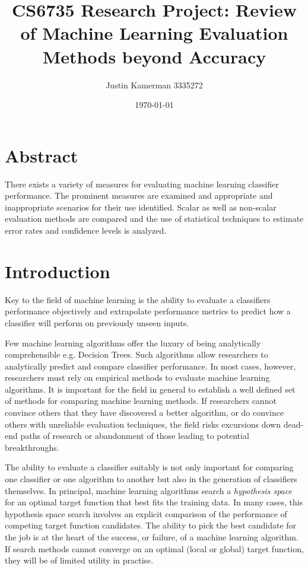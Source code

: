 \documentclass[10pt]{unbthesis}
\title{CS6735 Research Project: Review of Machine Learning Evaluation
  Methods beyond Accuracy}
\author{Justin Kamerman 3335272}
\date{\today}
\begin{document}
\maketitle
\renewcommand*\thesection{\arabic{section}}

\section*{Abstract}
There exists a variety of measures for evaluating machine
learning classifier performance. The prominent measures are examined
and appropriate and inappropriate scenarios for their use
identified. Scalar as well as non-scalar evaluation methods are
compared and the use of statistical techniques to estimate error rates
and confidence levels is analyzed.

\section{Introduction}
Key to the field of machine learning is the ability to evaluate a
classifiers performance objectively and extrapolate performance
metrics to predict how a classifier will perform on previously
unseen inputs. 

Few machine learning algorithms offer the luxury of being analytically
comprehensible e.g. Decision Trees. Such algorithms
allow researchers to analytically predict and compare classifier
performance. In most cases, however, researchers must rely on
empirical methods to evaluate machine learning algorithms. It is
important for the field in general to establish a well defined set of
methods for comparing machine learning methods. If researchers cannot
convince others that they have discovered a better algorithm, or do
convince others with unreliable evaluation techniques, the field risks
excursions down dead-end paths of research or abandonment of those
leading to potential breakthroughs. 

The ability to evaluate a classifier suitably is not
only important for comparing one classifier or one algorithm to
another but also in the generation of classifiers themselves. In
principal, machine learning algorithms search a
\textit{hypothesis space} for an optimal target function that best
fits the training data. In many cases, this hypothesis space search
involves an explicit comparison of the performance of competing target
function candidates. The ability to pick the best candidate for the
job is at the heart of the success, or failure, of a machine learning
algorithm. If search methods cannot converge on an optimal (local or
global) target function, they will be of limited utility in
practise.
\end{document}
